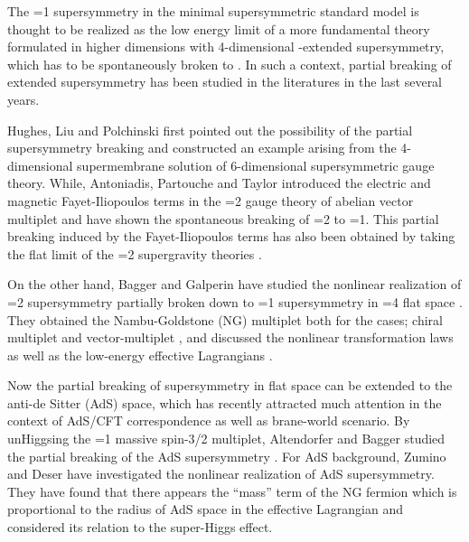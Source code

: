 \documentclass[a4paper,12pt]{article}
\begin{document}
\setcounter{page}{1}
%
\baselineskip 20pt
%
\vspace{0.3cm}
\vspace{0.3cm}

The \coordHE{}=1 supersymmetry in the minimal supersymmetric standard model 
is thought to be realized as the low energy limit of a more
fundamental theory formulated in higher dimensions with 4-dimensional
\coordHE{}-extended supersymmetry, 
which has to be spontaneously broken to \coordHE{}. 
In such a context, partial breaking of extended supersymmetry has been 
studied in the literatures \cite{HLP,APT,FGP,BG1,BG2} 
in the last several years.

Hughes, Liu and Polchinski \cite{HLP} first pointed out the possibility of the
partial supersymmetry breaking
and constructed an example arising from 
the 4-dimensional supermembrane solution 
of 6-dimensional supersymmetric gauge theory.
While, Antoniadis, 
Partouche and Taylor \cite{APT} introduced the electric and magnetic 
Fayet-Iliopoulos terms  in the \coordHE{}=2 gauge theory of abelian vector multiplet 
and have shown 
the spontaneous breaking of \coordHE{}=2 to \coordHE{}=1.
This partial breaking induced by the Fayet-Iliopoulos terms 
has also been obtained by taking the flat limit of the \coordHE{}=2 supergravity 
theories \cite{FGP}.

On the other hand, 
Bagger and Galperin \cite{BG1,BG2} have studied the 
nonlinear realization of \coordHE{}=2 supersymmetry partially broken down to \coordHE{}=1 
supersymmetry in \coordHE{}=4 flat space \cite{BW,SW}.
They obtained the Nambu-Goldstone (NG) multiplet both for the cases; chiral
multiplet \cite{BG1} and vector-multiplet \cite{BG2}, and discussed 
the nonlinear transformation laws as well as the low-energy effective 
Lagrangians \cite{B}.
 
Now the partial breaking of supersymmetry in flat space can be extended to
the anti-de Sitter (AdS) space, which has recently attracted much attention 
in the context of AdS/CFT correspondence as well as brane-world scenario.
By unHiggsing the \coordHE{}=1 massive spin-3/2
multiplet, Altendorfer and Bagger studied the partial breaking of the 
\coordHE{} AdS supersymmetry \coordHE{} \cite{AlB}.
For AdS background, Zumino and Deser \cite{Z,DZ} 
have investigated the nonlinear realization of \coordHE{} AdS supersymmetry.
They have found that there appears the ``mass'' term of the NG fermion 
which is proportional to the radius of AdS space in the effective Lagrangian 
and considered its relation to the super-Higgs effect.
\end{document}
